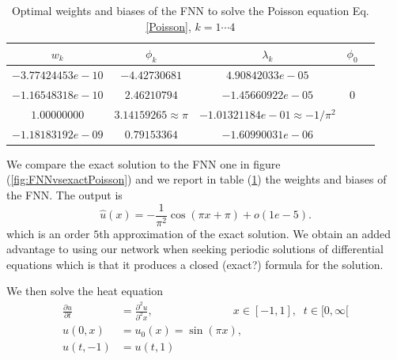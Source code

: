 \documentclass[11pt]{article}
\begin{document}
 \begin{table}[!h]
  \begin{center}
\begin{tabular}{ |c|c|c|c|c| } 
\hline
$w_k$ & $\phi_k$ & $\lambda_k$& $\phi_0$ \\
\hline
$-3.77424453e-10$ & $-4.42730681$ &$4.90842033e-05$& \\ 
$-1.16548318e-10$&$ 2.46210794$ & $-1.45660922e-05$& $0$ \\ 
$1.00000000$& $ 3.14159265 \approx \pi$ & $-1.01321184e-01 \approx -1/\pi^2$& \\ 
$ -1.18183192e-09$& $ 0.79153364 $ & $-1.60990031e-06$& \\ 
\hline
\end{tabular}
\caption{Optimal weights and biases of the FNN to solve the Poisson equation Eq. \ref{Poisson}, $k = 1\cdots4$ }\label{tabPoisson}
\end{center}
\end{table}


We compare the exact solution to the FNN one in figure (\ref{fig:FNNvsexactPoisson}) and we report in table (\ref{tabPoisson}) the weights and biases of the FNN. The output is 
$$\hat{u}(x) = -\frac{1}{\pi^2}\cos(\pi x + \pi) + o(1e-5).$$
which is an order $5$th approximation of the exact solution. We obtain an added advantage to using our network when seeking periodic solutions of differential equations which is that it produces a closed (exact?) formula for the solution.

We then solve the heat equation 
\begin{align}\label{Heat}
    \frac{\partial u}{\partial t} &= \frac{\partial^2 u}{\partial^2 x},\;\;\;\;\;\;\;\;\;\;\;\;\;\;\;\;\;\;\;\;\;\;\;\;\; \;x \in [-1,1], \; \;t \in [0,\infty[ \nonumber \\
    u(0,x) &= u_0(x) = \sin(\pi x),\\
    u(t, -1) &= u(t, 1) \nonumber
\end{align}
\end{document}
